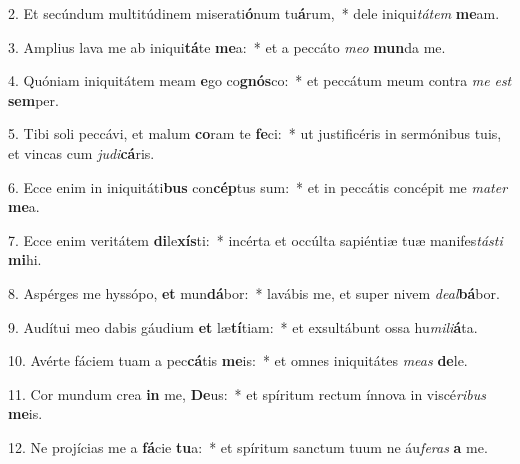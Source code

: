 
2. Et secúndum multitúdinem miserati\textbf{ó}num tu\textbf{á}rum,~* dele iniqui\textit{tá}\textit{tem} \textbf{me}am.

3. Amplius lava me ab iniqui\textbf{tá}te \textbf{me}a:~* et a peccáto \textit{me}\textit{o} \textbf{mun}da me.

4. Quóniam iniquitátem meam \textbf{e}go co\textbf{gnós}co:~* et peccátum meum contra \textit{me} \textit{est} \textbf{sem}per.

5. Tibi soli peccávi, et malum \textbf{co}ram te \textbf{fe}ci:~* ut justificéris in sermónibus tuis, et vincas cum \textit{ju}\textit{di}\textbf{cá}ris.

6. Ecce enim in iniquitáti\textbf{bus} con\textbf{cép}tus sum:~* et in peccátis concépit me \textit{ma}\textit{ter} \textbf{me}a.

7. Ecce enim veritátem \textbf{di}le\textbf{xís}ti:~* incérta et occúlta sapiéntiæ tuæ manifes\textit{tás}\textit{ti} \textbf{mi}hi.

8. Aspérges me hyssópo, \textbf{et} mun\textbf{dá}bor:~* lavábis me, et super nivem \textit{de}\textit{al}\textbf{bá}bor.

9. Audítui meo dabis gáudium \textbf{et} læ\textbf{tí}tiam:~* et exsultábunt ossa hu\textit{mi}\textit{li}\textbf{á}ta.

10. Avérte fáciem tuam a pec\textbf{cá}tis \textbf{me}is:~* et omnes iniquitátes \textit{me}\textit{as} \textbf{de}le.

11. Cor mundum crea \textbf{in} me, \textbf{De}us:~* et spíritum rectum ínnova in viscé\textit{ri}\textit{bus} \textbf{me}is.

12. Ne projícias me a \textbf{fá}cie \textbf{tu}a:~* et spíritum sanctum tuum ne áu\textit{fe}\textit{ras} \textbf{a} me.

